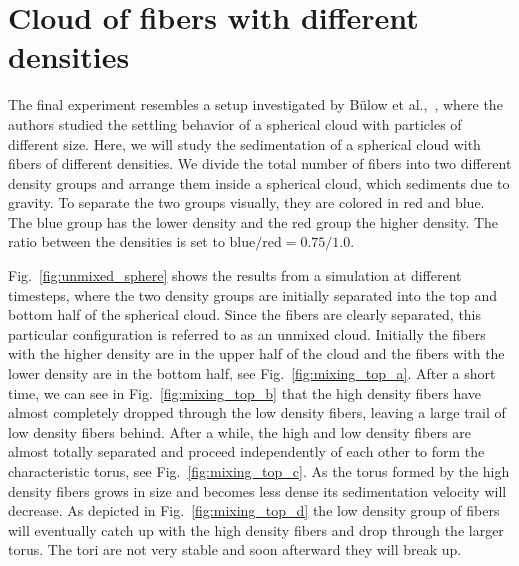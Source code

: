 \section{Cloud of fibers with different densities}
\label{sec:mixed_density_sphere}

The final experiment resembles a setup investigated by Bülow et al.,~\cite{Bulow2015}, where the authors studied the settling behavior of a spherical cloud with particles of different size. Here, we will study the sedimentation of a spherical cloud with fibers of different densities. We divide the total number of fibers into two different density groups and arrange them inside a spherical cloud, which sediments due to gravity. To separate the two groups visually, they are colored in red and blue. The blue group has the lower density and the red group the higher density. The ratio between the densities is set to $\text{blue} / \text{red}= 0.75 / 1.0$.

Fig.~\ref{fig:unmixed_sphere} shows the results from a simulation at different timesteps, where the two density groups are initially separated into the top and bottom half of the spherical cloud. Since the fibers are clearly separated, this particular configuration is referred to as an unmixed cloud. Initially the fibers with the higher density are in the upper half of the cloud and the fibers with the lower density are in the bottom half, see Fig.~\ref{fig:mixing_top_a}. After a short time, we can see in Fig.~\ref{fig:mixing_top_b} that the high density fibers have almost completely dropped through the low density fibers, leaving a large trail of low density fibers behind. After a while, the high and low density fibers are almost totally separated and proceed independently of each other to form the characteristic torus, see Fig.~\ref{fig:mixing_top_c}. As the torus formed by the high density fibers grows in size and becomes less dense its sedimentation velocity will decrease. As depicted in Fig.~\ref{fig:mixing_top_d} the low density group of fibers will eventually catch up with the high density fibers and drop through the larger torus. The tori are not very stable and soon afterward they will break up.

